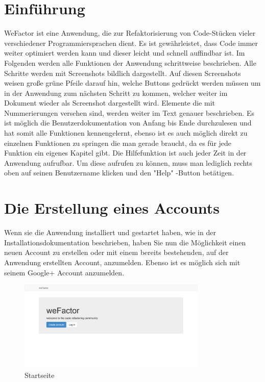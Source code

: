 
\thispagestyle{plain}

\chapter{Einführung}
WeFactor ist eine Anwendung, die zur Refaktorisierung von Code-Stücken vieler verschiedener Programmiersprachen dient. Es ist gewährleistet, dass Code immer weiter optimiert werden kann und dieser leicht und schnell auffindbar ist. 
Im Folgenden werden alle Funktionen der Anwendung schrittweise beschrieben. Alle Schritte werden mit Screenshots bildlich dargestellt. Auf diesen Screenshots weisen große grüne Pfeile darauf hin, welche Buttons gedrückt werden müssen um in der Anwendung zum nächsten Schritt zu kommen, welcher weiter im Dokument wieder als Screenshot dargestellt wird. Elemente die mit Nummerierungen versehen sind, werden weiter im Text genauer beschrieben.
Es ist möglich die Benutzerdokumentation von Anfang bis Ende durchzulesen und hat somit alle Funktionen kennengelernt, ebenso ist es auch möglich direkt zu einzelnen Funktionen zu springen die man gerade braucht, da es für jede Funktion ein eigenes Kapitel gibt.
Die Hilfefunktion ist auch jeder Zeit in der Anwendung aufrufbar. Um diese aufrufen zu können, muss man lediglich rechts oben auf seinen Benutzername klicken und den "Help" -Button betätigen. 



\chapter{Die Erstellung eines Accounts}
Wenn sie die Anwendung installiert und gestartet haben, wie in der Installationsdokumentation beschrieben, haben Sie nun die Möglichkeit einen neuen Account zu erstellen oder mit einem bereits bestehenden, auf der Anwendung erstellten Account, anzumelden. Ebenso ist es möglich sich mit seinem Google+ Account anzumelden.

\begin{figure}[H]
    \centering
    \includegraphics[width=0.8\textwidth]{Bilder/1.png}
    \caption{Startseite}
    \label{fig:startseite}
\end{figure}


